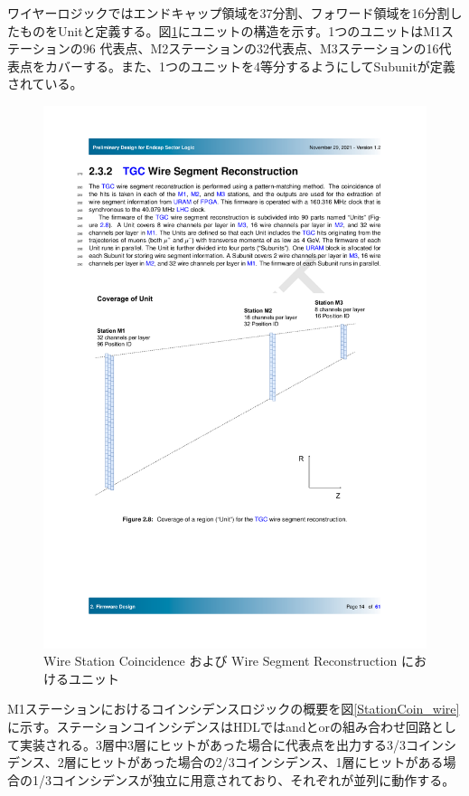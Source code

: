 ワイヤーロジックではエンドキャップ領域を37分割、フォワード領域を16分割したものをUnitと定義する。図\ref{StationCoin_unit}にユニットの構造を示す。1つのユニットはM1ステーションの96 代表点、M2ステーションの32代表点、M3ステーションの16代表点をカバーする。また、1つのユニットを4等分するようにしてSubunitが定義されている。

\begin{figure} 
    \centering
    \includegraphics[width=16cm]{fig/SL/StationCoin_unit.pdf}
    \caption[Wire Station Coincidence および Wire Segment Reconstruction におけるユニット]{Wire Station Coincidence および Wire Segment Reconstruction におけるユニット}
    \label{StationCoin_unit}
\end{figure}

M1ステーションにおけるコインシデンスロジックの概要を図\ref{StationCoin_wire}に示す。ステーションコインシデンスはHDLではandとorの組み合わせ回路として実装される。3層中3層にヒットがあった場合に代表点を出力する3/3コインシデンス、2層にヒットがあった場合の2/3コインシデンス、1層にヒットがある場合の1/3コインシデンスが独立に用意されており、それぞれが並列に動作する。

